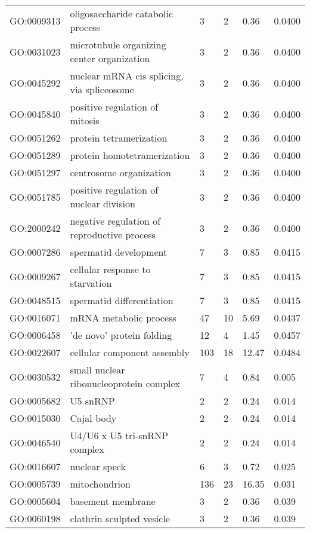 \documentclass[10pt]{bmc_article}
\newenvironment{bmcformat}{\begin{raggedright}\baselineskip20pt\sloppy\setboolean{publ}{false}}{\end{raggedright}\baselineskip20pt\sloppy}
\begin{document}
\begin{bmcformat}
\begin{longtable}{lp{3cm}llll}
  GO:0009313 & oligosaccharide catabolic process &   3 &   2 & 0.36 & 0.0400 \\ 
  GO:0031023 & microtubule organizing center organization &   3 &   2 & 0.36 & 0.0400 \\ 
  GO:0045292 & nuclear mRNA cis splicing, via spliceosome &   3 &   2 & 0.36 & 0.0400 \\ 
  GO:0045840 & positive regulation of mitosis &   3 &   2 & 0.36 & 0.0400 \\ 
  GO:0051262 & protein tetramerization &   3 &   2 & 0.36 & 0.0400 \\ 
  GO:0051289 & protein homotetramerization &   3 &   2 & 0.36 & 0.0400 \\ 
  GO:0051297 & centrosome organization &   3 &   2 & 0.36 & 0.0400 \\ 
  GO:0051785 & positive regulation of nuclear division &   3 &   2 & 0.36 & 0.0400 \\ 
  GO:2000242 & negative regulation of reproductive process &   3 &   2 & 0.36 & 0.0400 \\ 
  GO:0007286 & spermatid development &   7 &   3 & 0.85 & 0.0415 \\ 
  GO:0009267 & cellular response to starvation &   7 &   3 & 0.85 & 0.0415 \\ 
  GO:0048515 & spermatid differentiation &   7 &   3 & 0.85 & 0.0415 \\ 
  GO:0016071 & mRNA metabolic process &  47 &  10 & 5.69 & 0.0437 \\ 
  GO:0006458 & 'de novo' protein folding &  12 &   4 & 1.45 & 0.0457 \\ 
  GO:0022607 & cellular component assembly & 103 &  18 & 12.47 & 0.0484 \\ 
   \hline
GO:0030532 & small nuclear ribonucleoprotein complex &   7 &   4 & 0.84 & 0.005 \\ 
  GO:0005682 & U5 snRNP &   2 &   2 & 0.24 & 0.014 \\ 
  GO:0015030 & Cajal body &   2 &   2 & 0.24 & 0.014 \\ 
  GO:0046540 & U4/U6 x U5 tri-snRNP complex &   2 &   2 & 0.24 & 0.014 \\ 
  GO:0016607 & nuclear speck &   6 &   3 & 0.72 & 0.025 \\ 
  GO:0005739 & mitochondrion & 136 &  23 & 16.35 & 0.031 \\ 
  GO:0005604 & basement membrane &   3 &   2 & 0.36 & 0.039 \\ 
  GO:0060198 & clathrin sculpted vesicle &   3 &   2 & 0.36 & 0.039 \\ 
   \hline
\hline
\end{longtable}

\end{bmcformat}
\end{document}
